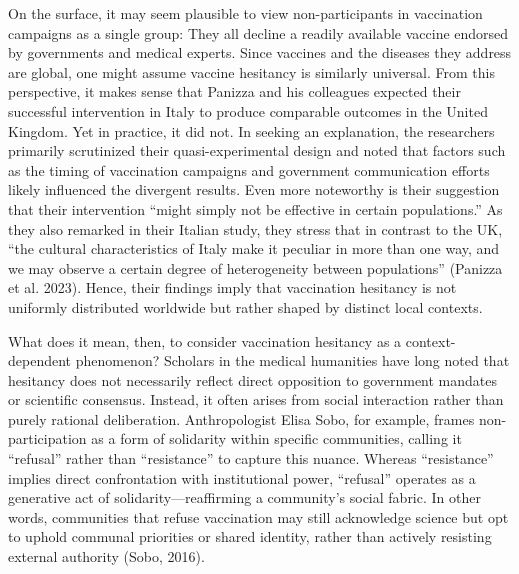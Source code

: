 \documentclass[authordate, empirical]{jote-new-article}
\begin{document}
	On the surface, it may seem plausible to view non-participants in vaccination campaigns as a single group: They all decline a readily available vaccine endorsed by governments and medical experts. Since vaccines and the diseases they address are global, one might assume vaccine hesitancy is similarly universal. From this perspective, it makes sense that Panizza and his colleagues expected their successful intervention in Italy to produce comparable outcomes in the United Kingdom. Yet in practice, it did not. In seeking an explanation, the researchers primarily scrutinized their quasi-experimental design and noted that factors such as the timing of vaccination campaigns and government communication efforts likely influenced the divergent results. Even more noteworthy is their suggestion that their intervention “might simply not be effective in certain populations.” As they also remarked in their Italian study, they stress that in contrast to the UK, “the cultural characteristics of Italy make it peculiar in more than one way, and we may observe a certain degree of heterogeneity between populations” (Panizza et al. 2023). Hence, their findings imply that vaccination hesitancy is not uniformly distributed worldwide but rather shaped by distinct local contexts.







	What does it mean, then, to consider vaccination hesitancy as a context-dependent phenomenon? Scholars in the medical humanities have long noted that hesitancy does not necessarily reflect direct opposition to government mandates or scientific consensus. Instead, it often arises from social interaction rather than purely rational deliberation. Anthropologist Elisa Sobo, for example, frames non-participation as a form of solidarity within specific communities, calling it “refusal” rather than “resistance” to capture this nuance. Whereas “resistance” implies direct confrontation with institutional power, “refusal” operates as a generative act of solidarity—reaffirming a community's social fabric. In other words, communities that refuse vaccination may still acknowledge science but opt to uphold communal priorities or shared identity, rather than actively resisting external authority (Sobo, 2016).
\end{document}
